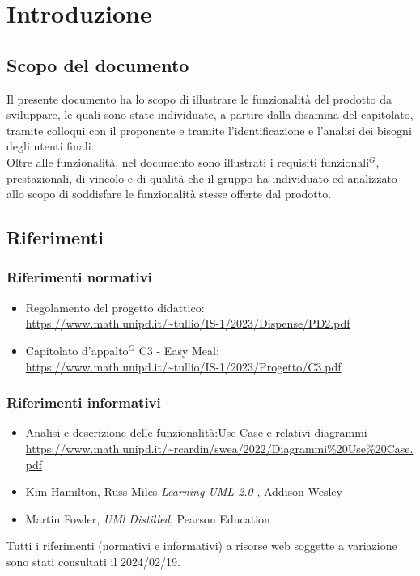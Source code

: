 
\section{Introduzione}

\subsection{Scopo del documento}

Il presente documento ha lo scopo di illustrare le funzionalità del prodotto da sviluppare,
le quali sono state individuate, a partire dalla disamina del capitolato, tramite colloqui con 
il proponente e tramite l'identificazione e l'analisi dei bisogni degli utenti finali.\\
Oltre alle funzionalità, nel documento sono illustrati i requisiti funzionali$^{G}$, prestazionali, di 
vincolo e di qualità che il gruppo ha individuato ed analizzato allo scopo di soddisfare le 
funzionalità stesse offerte dal prodotto. 

\subsection{Riferimenti}
\subsubsection{Riferimenti normativi}

\begin{itemize}
    \item Regolamento del progetto didattico: \\
    \url{https://www.math.unipd.it/~tullio/IS-1/2023/Dispense/PD2.pdf}
    \item Capitolato d’appalto$^{G}$ C3 - Easy Meal: \\
    \url{https://www.math.unipd.it/~tullio/IS-1/2023/Progetto/C3.pdf}
\end{itemize}

\subsubsection{Riferimenti informativi} 

\begin{itemize}
    \item Analisi e descrizione delle funzionalità:Use Case e relativi diagrammi \\
    \url{https://www.math.unipd.it/~rcardin/swea/2022/Diagrammi%20Use%20Case.pdf}
    \item Kim Hamilton, Russ Miles \emph{Learning UML 2.0 }, Addison Wesley \\
    \item Martin Fowler, \emph{UMl Distilled}, Pearson Education
\end{itemize}

Tutti i riferimenti (normativi e informativi) a risorse web soggette a variazione sono stati consultati il 2024/02/19.